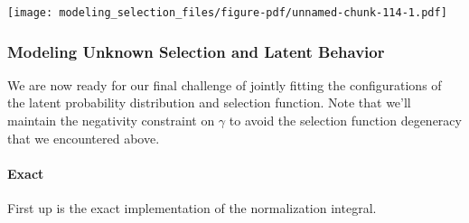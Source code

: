 \documentclass[
  letterpaper,
  DIV=11,
  numbers=noendperiod]{scrartcl}
\let\oldparagraph\paragraph
\renewcommand{\paragraph}[1]{\oldparagraph{#1}\mbox{}}
\begin{document}
\texttt{[image: modeling\_selection\_files/figure-pdf/unnamed-chunk-114-1.pdf]}

\subsubsection{Modeling Unknown Selection and Latent
Behavior}\label{modeling-unknown-selection-and-latent-behavior-1}

We are now ready for our final challenge of jointly fitting the
configurations of the latent probability distribution and selection
function. Note that we'll maintain the negativity constraint on
\(\gamma\) to avoid the selection function degeneracy that we
encountered above.

\paragraph{Exact}\label{exact-3}

First up is the exact implementation of the normalization integral.
\end{document}
